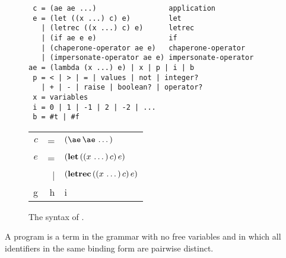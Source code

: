 \documentclass{sigplanconf}
\begin{document}
\newcommand{\true}[0]{\mathrm{\#t}}
\newcommand{\false}[0]{\mathrm{\#f}}
\setlength{\tabcolsep}{1pt}
\begin{figure}
\label{fig:syntax}

\begin{verbatim}
 c = (ae ae ...)                 application
 e = (let ((x ...) c) e)         let
   | (letrec ((x ...) c) e)      letrec
   | (if ae e e)                 if
   | (chaperone-operator ae e)   chaperone-operator
   | (impersonate-operator ae e) impersonate-operator
ae = (lambda (x ...) e) | x | p | i | b
 p = < | > | = | values | not | integer?
   | + | - | raise | boolean? | operator?
 x = variables
 i = 0 | 1 | -1 | 2 | -2 | ...
 b = #t | #f
\end{verbatim}


\begin{tabular}{rrl}
$c$ & = & $\appe{\ae}{\ae\,\dots}$\\
$e$ & = & $(\mathbf{let}\,((x\,\dots)\,c)\,e)$\\
    & | & $(\mathbf{letrec}\,((x\,\dots)\,c)\,e)$\\
g & h & i
\end{tabular}
\caption{The syntax of \chapcalc.}
\end{figure}

A program is a term in the grammar with no free variables and in which all identifiers in the same binding form are pairwise distinct.
\end{document}
